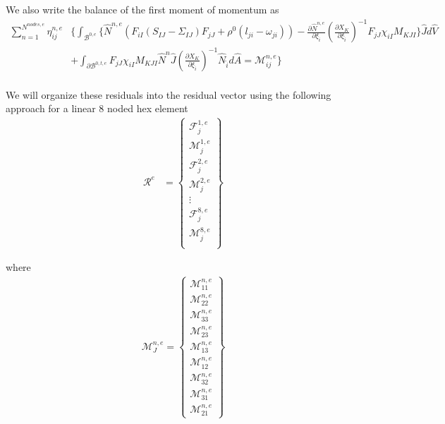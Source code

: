 We also write the balance of the first moment of momentum as
\begin{align*}
\sum_{n=1}^{N^{nodes,e}} \eta_{ij}^{n,e} &\bigg\{\int_{\mathcal{B}^{0,e}}  \bigg\{\hat{N}^{n,e} \left(F_{iI} \left(S_{IJ}-\Sigma_{IJ}\right) F_{jJ} + \rho^0\left(l_{ji} - \omega_{ji} \right)\right)  - \frac{\partial \hat{N}^{n,e}}{\partial \xi_{\hat{i}}} \left(\frac{\partial X_{K}}{\partial \xi_{\hat{i}}}\right)^{-1} F_{jJ} \chi_{iI}  M_{KJI} \bigg\} \hat{J} d\hat{V}\\
& + \int_{\partial \mathcal{B}^{0,t,e}} F_{jJ} \chi_{iI}  M_{KJI} \hat{N}^n \hat{J} \left(\frac{\partial X_{K}}{\partial \xi_{\hat{i}}}\right)^{-1} \hat{N}_{\hat{i}} d\hat{A} = \mathcal{M}_{ij}^{n,e} \bigg\}\\
\end{align*}

We will organize these residuals into the residual vector using the following approach for a linear 8 noded hex element
\begin{align*}
\mathcal{R}^e &= \left\{\begin{array}{c}
\mathcal{F}_j^{1,e}\\
\mathcal{M}_j^{1,e}\\
\mathcal{F}_j^{2,e}\\
\mathcal{M}_j^{2,e}\\
\vdots\\
\mathcal{F}_j^{8,e}\\
\mathcal{M}_j^{8,e}\\
\end{array}\right\}
\end{align*}

where
\begin{align*}
\mathcal{M}_J^{n,e} = \left\{\begin{array}{c}
\mathcal{M}_{11}^{n,e}\\
\mathcal{M}_{22}^{n,e}\\
\mathcal{M}_{33}^{n,e}\\
\mathcal{M}_{23}^{n,e}\\
\mathcal{M}_{13}^{n,e}\\
\mathcal{M}_{12}^{n,e}\\
\mathcal{M}_{32}^{n,e}\\
\mathcal{M}_{31}^{n,e}\\
\mathcal{M}_{21}^{n,e}
\end{array}\right\}
\end{align*}

